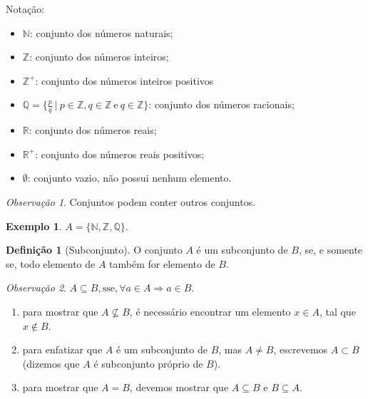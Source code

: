 \documentclass[]{book}
\providecommand{\tightlist}{%
  \setlength{\itemsep}{0pt}\setlength{\parskip}{0pt}}
\theoremstyle{definition}
\newtheorem{definition}{Definição}[chapter]
\theoremstyle{definition}
\newtheorem{example}{Exemplo}[chapter]
\theoremstyle{definition}
\theoremstyle{remark}
\newtheorem*{remark}{Observação}
\begin{document}
Notação:

\begin{itemize}
\tightlist
\item
  \(\mathbb{N}\): conjunto dos números naturais;
\item
  \(\mathbb{Z}\): conjunto dos números inteiros;
\item
  \(\mathbb{Z}^{+}\): conjunto dos números inteiros positivos
\item
  \(\mathbb{Q}=\big\{\frac{p}{q} \ | \ p \in \mathbb{Z}, q \in \mathbb{Z} \ \text{e} \ q \in \mathbb{Z} \big\}\): conjunto dos números racionais;
\item
  \(\mathbb{R}\): conjunto dos números reais;
\item
  \(\mathbb{R}^{+}\): conjunto dos números reais positivos;
\item
  \(\emptyset\): conjunto vazio, não possui nenhum elemento.
\end{itemize}

\begin{remark}
\iffalse{} {Observação. } \fi{}Conjuntos podem conter outros conjuntos.
\end{remark}

\begin{example}
\protect\hypertarget{exm:unnamed-chunk-4}{}{\label{exm:unnamed-chunk-4} }\(A = \{\mathbb{N}, \mathbb{Z}, \mathbb{Q}\}.\)
\end{example}

\begin{definition}[Subconjunto]
\protect\hypertarget{def:defSubConj}{}{\label{def:defSubConj} \iffalse (Subconjunto) \fi{} }O conjunto \(A\) é um subconjunto de \(B\), se, e somente se, todo elemento de \(A\) também for elemento de \(B\).
\end{definition}

\begin{remark}
\iffalse{} {Observação. } \fi{}\(A \subseteq B, \text{sse}, \forall a \in A \Rightarrow a \in B\).

\begin{enumerate}
\def\labelenumi{\arabic{enumi}.}
\item
  para mostrar que \(A \nsubseteq B\), é necessário encontrar um elemento \(x \in A\), tal que \(x \notin B\).
\item
  para enfatizar que \(A\) é um subconjunto de \(B\), mas \(A \ne B\), escrevemos \(A \subset B\) (dizemos que \(A\) é subconjunto próprio de \(B\)).
\item
  para mostrar que \(A = B\), devemos mostrar que \(A \subseteq B\) e \(B \subseteq A\).
\end{enumerate}
\end{remark}
\end{document}
